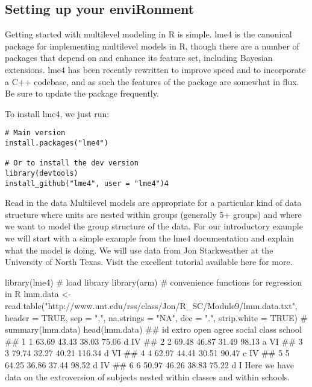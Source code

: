 
\subsection*{Setting up your enviRonment}

Getting started with multilevel modeling in R is simple. lme4 is the canonical package for implementing multilevel models in R, though there are a number of packages that depend on and enhance its feature set, including Bayesian extensions. lme4 has been recently rewritten to improve speed and to incorporate a C++ codebase, and as such the features of the package are somewhat in flux. Be sure to update the package frequently.

To install lme4, we just run:

\begin{framed}
\begin{verbatim}
# Main version
install.packages("lme4")

# Or to install the dev version
library(devtools)
install_github("lme4", user = "lme4")4
\end{verbatim}
\end{framed}
Read in the data
Multilevel models are appropriate for a particular kind of data structure where units are nested within groups (generally 5+ groups) and where we want to model the group structure of the data. For our introductory example we will start with a simple example from the lme4 documentation and explain what the model is doing. We will use data from Jon Starkweather at the University of North Texas. Visit the excellent tutorial available here for more.

library(lme4)  # load library
library(arm)  # convenience functions for regression in R
lmm.data <- read.table("http://www.unt.edu/rss/class/Jon/R_SC/Module9/lmm.data.txt", 
    header = TRUE, sep = ",", na.strings = "NA", dec = ".", strip.white = TRUE)
# summary(lmm.data)
head(lmm.data)
##   id extro  open agree social class school
## 1  1 63.69 43.43 38.03  75.06     d     IV
## 2  2 69.48 46.87 31.49  98.13     a     VI
## 3  3 79.74 32.27 40.21 116.34     d     VI
## 4  4 62.97 44.41 30.51  90.47     c     IV
## 5  5 64.25 36.86 37.44  98.52     d     IV
## 6  6 50.97 46.26 38.83  75.22     d      I
Here we have data on the extroversion of subjects nested within classes and within schools.

